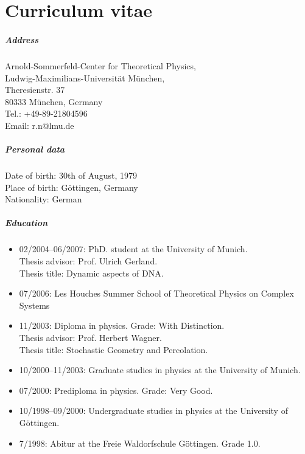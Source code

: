 \chapter*{Curriculum vitae}

\paragraph{Address}
\begin{flushleft}
Arnold-Sommerfeld-Center for Theoretical Physics,\\
Ludwig-Maximilians-Universit\"at M\"unchen,\\
Theresienstr. 37 \\
80333 M\"unchen, Germany\\
Tel.: +49-89-21804596 \\
Email: r.n@lmu.de \\
\end{flushleft}


\paragraph{Personal data}
\begin{flushleft}
Date of birth: 30th of August, 1979\\
Place of birth: G\"ottingen, Germany \\
Nationality: German\\
\end{flushleft}

\paragraph{Education}
\begin{itemize}
\item 02/2004--06/2007: PhD. student at the University of Munich.\\
	Thesis advisor: Prof. Ulrich Gerland.\\
	Thesis title: Dynamic aspects of DNA.
\item  07/2006: Les Houches Summer School of Theoretical Physics on Complex Systems
\item 11/2003: Diploma in physics. Grade: With Distinction.\\
	Thesis advisor: Prof. Herbert Wagner.\\
	Thesis title: Stochastic Geometry and Percolation.
\item 10/2000--11/2003: Graduate studies in physics at the University of Munich.
\item 07/2000: Prediploma in physics. Grade: Very Good.
\item 10/1998--09/2000: Undergraduate studies in physics at the University of G\"ottingen.
\item 7/1998: Abitur at the Freie Waldorfschule G\"ottingen. Grade 1.0.
\end{itemize}

